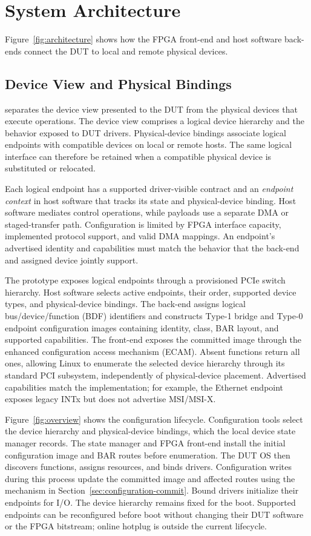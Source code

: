 \section{System Architecture}
\label{sec:architecture}
\label{sec:overview}
\label{sec:design}

Figure~\ref{fig:architecture} shows how the FPGA front-end and host software
back-ends connect the DUT to local and remote physical devices.

\subsection{Device View and Physical Bindings}

\sys separates the device view presented to the DUT from the physical
devices that execute operations. The device view comprises a logical
device hierarchy and the behavior exposed to DUT drivers. Physical-device
bindings associate logical endpoints with compatible devices on local or
remote hosts. The same logical interface can therefore be retained when
a compatible physical device is substituted or relocated.

Each logical endpoint has a supported driver-visible contract and an
\emph{endpoint context} in host software that tracks its state and
physical-device binding. Host software mediates control operations, while
payloads use a separate DMA or staged-transfer path. Configuration is
limited by FPGA interface capacity, implemented protocol support, and
valid DMA mappings. An endpoint's advertised identity and capabilities
must match the behavior that the back-end and assigned device jointly support.

The prototype exposes logical endpoints through a provisioned PCIe switch
hierarchy. Host software selects active endpoints, their order, supported
device types, and physical-device bindings. The back-end assigns logical
bus/device/function (BDF) identifiers and constructs Type-1 bridge and Type-0
endpoint configuration images containing identity, class, BAR layout, and
supported capabilities. The front-end exposes the committed image through
the enhanced configuration access mechanism (ECAM). Absent functions return
all ones, allowing Linux to enumerate the selected device hierarchy through
its standard PCI subsystem, independently of physical-device placement.
Advertised capabilities match the implementation; for example, the Ethernet
endpoint exposes legacy INTx but does not advertise MSI/MSI-X.

Figure~\ref{fig:overview} shows the configuration lifecycle. Configuration
tools select the device hierarchy and physical-device bindings, which the
local device state manager records. The state manager and FPGA front-end
install the initial configuration image and BAR routes before enumeration.
The DUT OS then discovers functions, assigns resources, and binds drivers.
Configuration writes during this process update the committed image and
affected routes using the mechanism in Section~\ref{sec:configuration-commit}.
Bound drivers initialize their endpoints for I/O. The device hierarchy
remains fixed for the boot. Supported endpoints can be reconfigured before
boot without changing their DUT software or the FPGA bitstream; online
hotplug is outside the current lifecycle.

